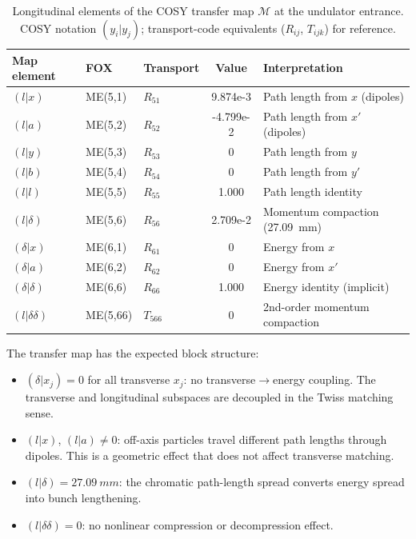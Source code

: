 \documentclass[11pt]{article}
\begin{document}
\begin{table}[ht]
\centering
\caption{Longitudinal elements of the COSY transfer map $\mathcal{M}$ at
  the undulator entrance.  COSY notation $(y_i|y_j)$; transport-code
  equivalents ($R_{ij}$, $T_{ijk}$) for reference.}
\label{tab:map}
\begin{tabular}{@{} l l l S[table-format=+1.4e-1] l @{}}
\toprule
{Map element} & {FOX} & {Transport} & {Value} & {Interpretation} \\
\midrule
$(l|x)$        & ME(5,1)  & $R_{51}$  &  9.874e-3  & Path length from $x$ (dipoles) \\
$(l|a)$        & ME(5,2)  & $R_{52}$  & -4.799e-2  & Path length from $x'$ (dipoles) \\
$(l|y)$        & ME(5,3)  & $R_{53}$  &  0         & Path length from $y$ \\
$(l|b)$        & ME(5,4)  & $R_{54}$  &  0         & Path length from $y'$ \\
$(l|l)$        & ME(5,5)  & $R_{55}$  &  1.000     & Path length identity \\
$(l|\delta)$   & ME(5,6)  & $R_{56}$  &  2.709e-2  & Momentum compaction (\SI{27.09}{mm}) \\
\midrule
$(\delta|x)$   & ME(6,1) & $R_{61}$  &  0         & Energy from $x$ \\
$(\delta|a)$   & ME(6,2) & $R_{62}$  &  0         & Energy from $x'$ \\
$(\delta|\delta)$ & ME(6,6) & $R_{66}$ & 1.000    & Energy identity (implicit) \\
\midrule
$(l|\delta\delta)$ & ME(5,66) & $T_{566}$ & 0     & 2nd-order momentum compaction \\
\bottomrule
\end{tabular}
\end{table}

The transfer map has the expected block structure:
\begin{itemize}
  \item $(\delta|x_j) = 0$ for all transverse $x_j$: no
    transverse$\to$energy coupling.  The transverse and longitudinal
    subspaces are decoupled in the Twiss matching sense.
  \item $(l|x)$, $(l|a) \neq 0$: off-axis particles travel different
    path lengths through dipoles.  This is a geometric effect that
    does not affect transverse matching.
  \item $(l|\delta) = \SI{27.09}{mm}$: the chromatic path-length
    spread converts energy spread into bunch lengthening.
  \item $(l|\delta\delta) = 0$: no nonlinear compression or
    decompression effect.
\end{itemize}
\end{document}
